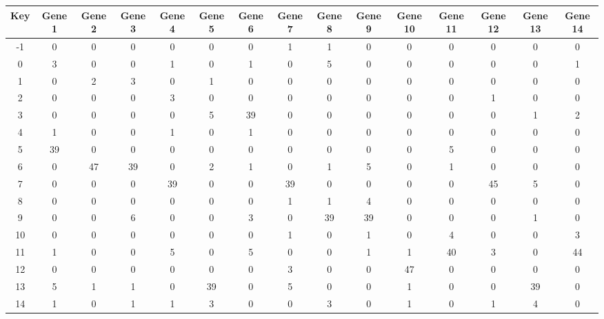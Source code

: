 \begin{tabular}{|c|c|c|c|c|c|c|c|c|c|c|c|c|c|c|}
\hline
Key & Gene 1 & Gene 2 & Gene 3 & Gene 4 & Gene 5 & Gene 6 & Gene 7 & Gene 8 & Gene 9 & Gene 10 & Gene 11 & Gene 12 & Gene 13 & Gene 14 \\
\hline
-1 & 0 & 0 & 0 & 0 & 0 & 0 & 1 & 1 & 0 & 0 & 0 & 0 & 0 & 0 \\
0 & 3 & 0 & 0 & 1 & 0 & 1 & 0 & 5 & 0 & 0 & 0 & 0 & 0 & 1 \\
1 & 0 & 2 & 3 & 0 & 1 & 0 & 0 & 0 & 0 & 0 & 0 & 0 & 0 & 0 \\
2 & 0 & 0 & 0 & 3 & 0 & 0 & 0 & 0 & 0 & 0 & 0 & 1 & 0 & 0 \\
3 & 0 & 0 & 0 & 0 & 5 & 39 & 0 & 0 & 0 & 0 & 0 & 0 & 1 & 2 \\
4 & 1 & 0 & 0 & 1 & 0 & 1 & 0 & 0 & 0 & 0 & 0 & 0 & 0 & 0 \\
5 & 39 & 0 & 0 & 0 & 0 & 0 & 0 & 0 & 0 & 0 & 5 & 0 & 0 & 0 \\
6 & 0 & 47 & 39 & 0 & 2 & 1 & 0 & 1 & 5 & 0 & 1 & 0 & 0 & 0 \\
7 & 0 & 0 & 0 & 39 & 0 & 0 & 39 & 0 & 0 & 0 & 0 & 45 & 5 & 0 \\
8 & 0 & 0 & 0 & 0 & 0 & 0 & 1 & 1 & 4 & 0 & 0 & 0 & 0 & 0 \\
9 & 0 & 0 & 6 & 0 & 0 & 3 & 0 & 39 & 39 & 0 & 0 & 0 & 1 & 0 \\
10 & 0 & 0 & 0 & 0 & 0 & 0 & 1 & 0 & 1 & 0 & 4 & 0 & 0 & 3 \\
11 & 1 & 0 & 0 & 5 & 0 & 5 & 0 & 0 & 1 & 1 & 40 & 3 & 0 & 44 \\
12 & 0 & 0 & 0 & 0 & 0 & 0 & 3 & 0 & 0 & 47 & 0 & 0 & 0 & 0 \\
13 & 5 & 1 & 1 & 0 & 39 & 0 & 5 & 0 & 0 & 1 & 0 & 0 & 39 & 0 \\
14 & 1 & 0 & 1 & 1 & 3 & 0 & 0 & 3 & 0 & 1 & 0 & 1 & 4 & 0 \\
\hline
\end{tabular}